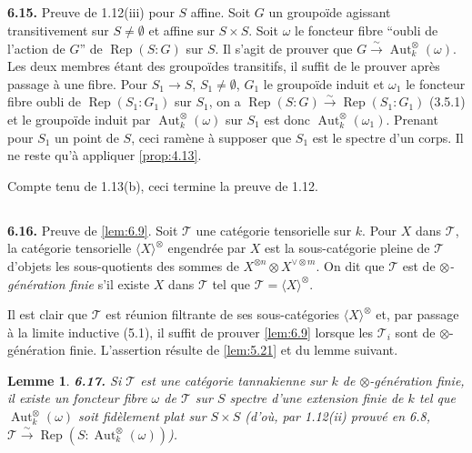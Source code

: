 \documentclass[12pt,a4paper]{article}
\theoremstyle{plain}
\newtheorem{lemma}[theorem]{Lemme}
\theoremstyle{definition}
\theoremstyle{remark}
\DeclareMathOperator{\Aut}{Aut}
\DeclareMathOperator{\Rep}{Rep}
\begin{document}
\subsection{}

\textbf{6.15.} Preuve de 1.12(iii) pour $S$ affine. Soit $G$ un groupoïde agissant transitivement sur $S \neq \emptyset$ et affine sur $S \times S$. Soit $\omega$ le foncteur fibre ``oubli de l'action de $G$'' de $\Rep(S:G)$ sur $S$. Il s'agit de prouver que $G \xrightarrow{\sim} \Aut^\otimes_k(\omega)$. Les deux membres étant des groupoïdes transitifs, il suffit de le prouver après passage à une fibre. Pour $S_1 \to S$, $S_1 \neq \emptyset$, $G_1$ le groupoïde induit et $\omega_1$ le foncteur fibre oubli de $\Rep(S_1:G_1)$ sur $S_1$, on a $\Rep(S:G) \xrightarrow{\sim} \Rep(S_1:G_1)$ (3.5.1) et le groupoïde induit par $\Aut^\otimes_k(\omega)$ sur $S_1$ est donc $\Aut^\otimes_k(\omega_1)$. Prenant pour $S_1$ un point de $S$, ceci ramène à supposer que $S_1$ est le spectre d'un corps. Il ne reste qu'à appliquer \ref{prop:4.13}.

Compte tenu de 1.13(b), ceci termine la preuve de 1.12.

\subsection{}

\textbf{6.16.} Preuve de \ref{lem:6.9}. Soit $\mathcal{T}$ une catégorie tensorielle sur $k$. Pour $X$ dans $\mathcal{T}$, la catégorie tensorielle $\langle X \rangle^\otimes$ engendrée par $X$ est la sous-catégorie pleine de $\mathcal{T}$ d'objets les sous-quotients des sommes de $X^{\otimes n} \otimes X^{\vee \otimes m}$. On dit que $\mathcal{T}$ est de \emph{$\otimes$-génération finie} s'il existe $X$ dans $\mathcal{T}$ tel que $\mathcal{T} = \langle X \rangle^\otimes$.

Il est clair que $\mathcal{T}$ est réunion filtrante de ses sous-catégories $\langle X \rangle^\otimes$ et, par passage à la limite inductive (5.1), il suffit de prouver \ref{lem:6.9} lorsque les $\mathcal{T}_i$ sont de $\otimes$-génération finie. L'assertion résulte de \ref{lem:5.21} et du lemme suivant.

\begin{lemma}\label{lem:6.17}
\textbf{6.17.} Si $\mathcal{T}$ est une catégorie tannakienne sur $k$ de $\otimes$-génération finie, il existe un foncteur fibre $\omega$ de $\mathcal{T}$ sur $S$ spectre d'une extension finie de $k$ tel que $\Aut^\otimes_k(\omega)$ soit fidèlement plat sur $S \times S$ (d'où, par 1.12(ii) prouvé en 6.8, $\mathcal{T} \xrightarrow{\sim} \Rep(S:\Aut^\otimes_k(\omega))$).
\end{lemma}
\end{document}
